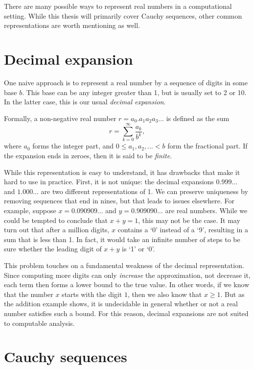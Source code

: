 \documentclass[leqno]{report}
\begin{document}
There are many possible ways to represent real numbers in a computational setting. While this thesis will primarily cover Cauchy sequences, other common representations are worth mentioning as well.

\section{Decimal expansion}

One naive approach is to represent a real number by a sequence of digits in some base $b$. This base can be any integer greater than 1, but is usually set to 2 or 10. In the latter case, this is our usual \textit{decimal expansion}.

Formally, a non-negative real number $r = a_0 . a_1 a_2 a_3 \ldots$ is defined as the sum
\[
    r = \sum_{k=0}^\infty \frac{a_k}{b^k},
\]
where $a_0$ forms the integer part, and $0 \leq a_1, a_2, \ldots < b$ form the fractional part. If the expansion ends in zeroes, then it is said to be \textit{finite}.

While this representation is easy to understand, it has drawbacks that make it hard to use in practice. First, it is not unique: the decimal expansions $0.999\ldots$ and $1.000\ldots$ are two different representations of 1. We can preserve uniqueness by removing sequences that end in nines, but that leads to issues elsewhere. For example, suppose $x = 0.090909\ldots$ and $y = 0.909090\ldots$ are real numbers. While we could be tempted to conclude that $x + y = 1$, this may not be the case. It may turn out that after a million digits, $x$ contains a `0' instead of a `9', resulting in a sum that is less than 1. In fact, it would take an infinite number of steps to be sure whether the leading digit of $x + y$ is `1' or `0'.

This problem touches on a fundamental weakness of the decimal representation. Since computing more digits can only \emph{increase} the approximation, not decrease it, each term then forms a lower bound to the true value. In other words, if we know that the number $x$ starts with the digit $1$, then we also know that $x \geq 1$. But as the addition example shows, it is undecidable in general whether or not a real number satisfies such a bound. For this reason, decimal expansions are not suited to computable analysis.

\section{Cauchy sequences}
\end{document}
